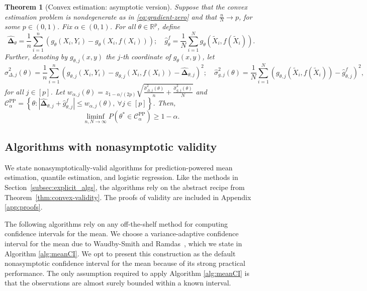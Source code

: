 \documentclass[10pt]{article}
\newtheorem{theorem}{Theorem}
\def\R{\mathbb{R}}
\newcommand{\Xt}{\widetilde{X}}
\newcommand{\rechat}{\hat{\mathbf{\Delta}}}
\newcommand{\CPP}{\mathcal{C}^{\mathrm{PP}}}
\begin{document}
\begin{theorem}[Convex estimation: asymptotic version]
\label{thm:convex-validity_asymptotic}
Suppose that the convex estimation problem is nondegenerate as in \eqref{eq:gradient-zero} and that $\frac{n}{N}\rightarrow p$, for some $p\in(0,1)$. Fix $\alpha\in(0,1)$. For all $\theta\in\R^p$, define
$$\rechat_{\theta} = \frac{1}{n}\sum_{i=1}^n \left(g_\theta(X_i,Y_i) - g_\theta(X_i,f(X_i)) \right); \quad \hat g^f_\theta = \frac{1}{N} \sum_{i=1}^N g_\theta(\Xt_i,f(\Xt_i)).$$
Further, denoting by $g_{\theta,j}(x,y)$ the $j$-th coordinate of $g_\theta(x,y)$, let 
$$\hat\sigma^2_{\Delta,j}(\theta) = \frac{1}{n} \sum_{i=1}^n \left(g_{\theta,j}(X_i,Y_i) - g_{\theta,j}(X_i,f(X_i)) - \rechat_{\theta, j} \right)^2; \quad \hat \sigma^2_{g,j}(\theta) = \frac{1}{N} \sum_{i=1}^N \left(g_{\theta,j}(\Xt_i,f(\Xt_i)) - \hat g^f_{\theta, j}\right)^2,$$
for all $j\in[p]$.
Let $w_{\alpha,j}(\theta) = z_{1-\alpha/(2p)}\sqrt{\frac{\hat\sigma^2_{\Delta,j}(\theta)}{n} + \frac{\hat \sigma^2_{g,j}(\theta)}{N}}$ and $\CPP_\alpha = \left\{\theta : |\rechat_{\theta, j} + \hat g^f_{\theta, j}| \leq w_{\alpha,j}(\theta),~\forall j\in[p]\right\}$. Then,
\begin{equation}
    \liminf_{n,N\rightarrow\infty} P( \theta^* \in \CPP_\alpha ) \geq 1-\alpha.
\end{equation}
\end{theorem}




\subsection{Algorithms with nonasymptotic validity}
\label{app:nonasymptotic-algos}

We state nonasymptotically-valid algorithms for prediction-powered mean estimation, quantile estimation, and logistic regression. Like the methods in Section~\ref{subsec:explicit_algs}, the algorithms rely on the abstract recipe from Theorem~\ref{thm:convex-validity}. The proofs of validity are included in Appendix \ref{app:proofs}.

The following algorithms rely on any off-the-shelf method for computing confidence intervals for the mean. We choose a variance-adaptive confidence interval for the mean due to Waudby-Smith and Ramdas~\cite{waudby2020variance}, which we state in
Algorithm \ref{alg:meanCI}.
We opt to present this construction as the default nonasymptotic confidence interval for the mean because of its strong practical performance.
The only assumption required to apply Algorithm \ref{alg:meanCI} is that the observations are almost surely bounded within a known interval.
\end{document}
